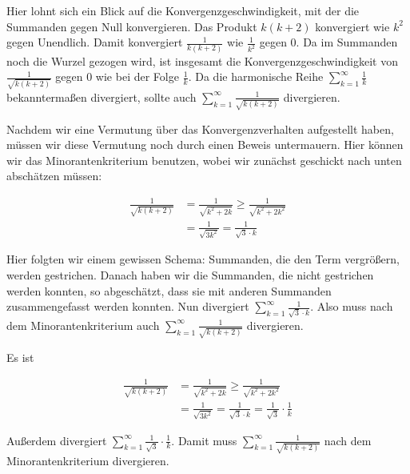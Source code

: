 \documentclass[fontsize=9pt,
               parskip=half-,
               DIV=14,
               listof=chapterentry,
               tocflat]{scrbook}
\begin{document}
\begin{solutionprocess*}[Minorantenkriterium]
Hier lohnt sich ein Blick auf die Konvergenzgeschwindigkeit, mit der die Summanden gegen Null konvergieren. Das Produkt $k(k+2)$ konvergiert wie $k^{2}$ gegen Unendlich. Damit konvergiert ${\tfrac {1}{k(k+2)}}$ wie ${\tfrac {1}{k^{2}}}$ gegen 0. Da im Summanden noch die Wurzel gezogen wird, ist insgesamt die Konvergenzgeschwindigkeit von ${\tfrac {1}{\sqrt {k(k+2)}}}$ gegen 0 wie bei der Folge ${\tfrac {1}{k}}$. Da die harmonische Reihe $\sum _{k=1}^{\infty }{\tfrac {1}{k}}$ bekanntermaßen divergiert, sollte auch $\sum _{k=1}^{\infty }{\tfrac {1}{\sqrt {k(k+2)}}}$ divergieren.

Nachdem wir eine Vermutung über das Konvergenzverhalten aufgestellt haben, müssen wir diese Vermutung noch durch einen Beweis untermauern. Hier können wir das Minorantenkriterium benutzen, wobei wir zunächst geschickt nach unten abschätzen müssen:

\begin{align*}
{\frac {1}{\sqrt {k(k+2)}}}&={\frac {1}{\sqrt {k^{2}+2k}}}\geq {\frac {1}{\sqrt {k^{2}+2k^{2}}}}\\[0.3em]&={\frac {1}{\sqrt {3k^{2}}}}={\frac {1}{{\sqrt {3}}\cdot k}}
\end{align*}

Hier folgten wir einem gewissen Schema: Summanden, die den Term vergrößern, werden gestrichen. Danach haben wir die Summanden, die nicht gestrichen werden konnten, so abgeschätzt, dass sie mit anderen Summanden zusammengefasst werden konnten. Nun divergiert $\sum _{k=1}^{\infty }{\tfrac {1}{{\sqrt {3}}\cdot k}}$. Also muss nach dem Minorantenkriterium auch $\sum _{k=1}^{\infty }{\tfrac {1}{\sqrt {k(k+2)}}}$ divergieren.

\end{solutionprocess*}

\begin{proof*}[Minorantenkriterium]
Es ist

\begin{align*}
{\frac {1}{\sqrt {k(k+2)}}}&={\frac {1}{\sqrt {k^{2}+2k}}}\geq {\frac {1}{\sqrt {k^{2}+2k^{2}}}}\\[0.5em]&={\frac {1}{\sqrt {3k^{2}}}}={\frac {1}{{\sqrt {3}}\cdot k}}={\frac {1}{\sqrt {3}}}\cdot {\frac {1}{k}}
\end{align*}

Außerdem divergiert $\sum _{k=1}^{\infty }{\tfrac {1}{\sqrt {3}}}\cdot {\tfrac {1}{k}}$. Damit muss $\sum _{k=1}^{\infty }{\tfrac {1}{\sqrt {k(k+2)}}}$ nach dem Minorantenkriterium divergieren.

\end{proof*}
\end{document}
